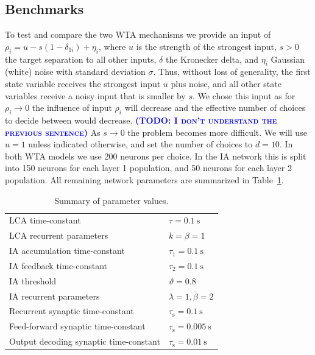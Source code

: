 \documentclass[10pt,letterpaper]{article}
\makeatletter
\newcommand{\todo}[1]{\textbf{\textsc{\textcolor{blue}{(TODO\@: #1)}}}}
\makeatother
\begin{document}
\subsection{Benchmarks}
To test and compare the two WTA mechanisms we provide an input of $\rho_i = u - s(1 - \delta_{1i}) + \eta_i$, where $u$ is the strength of the strongest input, 
$s > 0$ the target separation to all other inputs, $\delta$ the Kronecker delta, and $\eta_i$ Gaussian (white) noise with standard deviation $\sigma$.
Thus, without loss of generality, the first state variable receives the strongest input $u$ plus noise, and all other state variables receive a noisy input that is smaller by $s$.
We chose this input as for $\rho_i \rightarrow 0$ the influence of input $\rho_i$ will decrease and the effective number of choices to decide between would decrease.
\todo{I don't understand the previous sentence}
As $s \rightarrow 0$ the problem becomes more difficult.
We will use $u = 1$ unless indicated otherwise, and set the number of choices to $d = 10$.
In both WTA models we use 200 neurons per choice.
In the IA network this is split into 150 neurons for each layer 1 population, and 50 neurons for each layer 2 population.
All remaining network parameters are summarized in Table~\ref{tbl:params}.
\begin{table}
    \caption{Summary of parameter values.}\label{tbl:params}
    \begin{tabular}{ll}
        LCA time-constant & $\tau = \SI{0.1}{\second}$ \\
        LCA recurrent parameters & $k = \beta = 1$ \\
        IA accumulation time-constant & $\tau_1 = \SI{0.1}{\second}$ \\
        IA feedback time-constant & $\tau_2 = \SI{0.1}{\second}$ \\
        IA threshold & $\vartheta = 0.8$ \\
        IA recurrent parameters & $\lambda = 1, \bar{\beta} = 2$ \\
        Recurrent synaptic time-constant & $\tau_{\mathrm{s}} 
        = \SI{0.1}{\second}$ \\
        Feed-forward synaptic time-constant & $\tau_{\mathrm{s}} 
        = \SI{0.005}{\second}$ \\
        Output decoding synaptic time-constant & $\tau_{\mathrm{s}} 
        = \SI{0.01}{\second}$
    \end{tabular}
\end{table}
\end{document}
